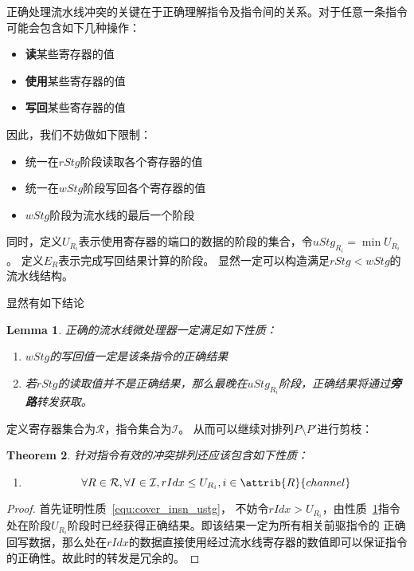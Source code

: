 \documentclass[hyperref,UTF8]{ctexart}
\newtheorem{thm}{Theorem}[subsection]
\newtheorem{lem}[thm]{Lemma}
\theoremstyle{definition}
\theoremstyle{remark}
\numberwithin{equation}{subsection}
\newcommand{\Emph}{\textbf}
\begin{document}
	正确处理流水线冲突的关键在于正确理解指令及指令间的关系。对于任意一条指令可能会包含如下几种操作：
	\begin{itemize}
		\item \Emph{读}某些寄存器的值
		\item \Emph{使用}某些寄存器的值
		\item \Emph{写回}某些寄存器的值
	\end{itemize}
	因此，我们不妨做如下限制：
	\begin{itemize}
		\item 统一在$rStg$阶段读取各个寄存器的值
		\item 统一在$wStg$阶段写回各个寄存器的值
		\item $wStg$阶段为流水线的最后一个阶段
	\end{itemize}
	同时，定义$U_{R_i}$表示使用寄存器的端口的数据的阶段的集合，令$uStg_{R_i} = \min U_{R_i}$。
	定义$E_{R}$表示完成写回结果计算的阶段。
	显然一定可以构造满足$rStg < wStg$的流水线结构。
	
	显然有如下结论
	\begin{lem}
	\label{lem:insn_operator}
	正确的流水线微处理器一定满足如下性质：
	\begin{enumerate}[(1)]
	
		\item $wStg$的写回值一定是该条指令的正确结果
		
		\item 若$rStg$的读取值并不是正确结果，那么最晚在$uStg_{R_i}$阶段，正确结果将通过\Emph{旁路}转发获取。
		
	\end{enumerate}
	\end{lem}
	
	定义寄存器集合为$\mathcal{R}$，指令集合为$\mathcal{I}$。
	从而可以继续对排列$P \setminus P'$进行剪枝：
	\begin{thm}
	\label{thm:valid_perm_property_I}
	针对指令有效的冲突排列还应该包含如下性质：
	\begin{enumerate}[(1)]
		
		\item
		\begin{equation}
			\forall R \in \mathcal{R}, \forall I \in \mathcal{I}, rIdx \le U_{R_i}, i \in \attrib{R}{channel}	\label{equ:cover_insn_ustg}
		\end{equation}
		
	\end{enumerate}
	\end{thm}
	
	\begin{proof}
	首先证明性质~\ref{equ:cover_insn_ustg}，
	不妨令$rIdx > U_{R_i}$，由性质~\ref{lem:insn_operator}指令处在阶段$U_{R_i}$阶段时已经获得正确结果。即该结果一定为所有相关前驱指令的
	正确回写数据，那么处在$rIdx$的数据直接使用经过流水线寄存器的数值即可以保证指令的正确性。故此时的转发是冗余的。
	
	\end{proof}
	
\end{document}
